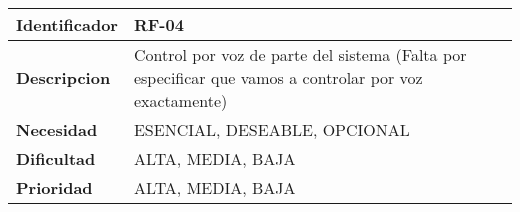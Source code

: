 \begin{center}
    \begin{tabular}{|p{2.6cm}|p{12cm}|}
    \hline
    \textbf{Identificador} & RF-04\\
    \hline
    \textbf{Descripcion} & Control por voz de parte del sistema (Falta por especificar que vamos a controlar por voz exactamente)\\
    \hline
    \textbf{Necesidad} & ESENCIAL, DESEABLE, OPCIONAL\\
    \hline
    \textbf{Dificultad} & ALTA, MEDIA, BAJA\\
    \hline
    \textbf{Prioridad} & ALTA, MEDIA, BAJA\\
    \hline
    \end{tabular}
\end{center}
